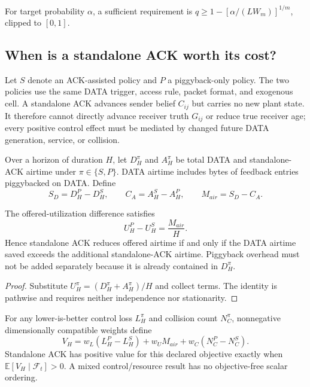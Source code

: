 For target probability $\alpha$, a sufficient requirement is
$q\ge1-[\alpha/(LW_m)]^{1/m}$, clipped to $[0,1]$.

\subsection{When is a standalone ACK worth its cost?}

Let $S$ denote an ACK-assisted policy and $P$ a piggyback-only policy.  The
two policies use the same DATA trigger, access rule, packet format, and
exogenous cell.  A standalone ACK advances sender belief $C_{ij}$ but carries
no new plant state.  It therefore cannot directly advance receiver truth
$G_{ij}$ or reduce true receiver age; every positive control effect must be
mediated by changed future DATA generation, service, or collision.

Over a horizon of duration $H$, let $D_H^\pi$ and $A_H^\pi$ be total DATA and
standalone-ACK airtime under $\pi\in\{S,P\}$.  DATA airtime includes bytes of
feedback entries piggybacked on DATA.  Define
\begin{equation}
S_D=D_H^P-D_H^S,\qquad
C_A=A_H^S-A_H^P,\qquad
M_{air}=S_D-C_A.
\label{eq:s2-ack-accounting-defs}
\end{equation}

\begin{proposition}
The offered-utilization difference satisfies
\begin{equation}
U_H^P-U_H^S=\frac{M_{air}}{H}.
\label{eq:s2-ack-accounting}
\end{equation}
Hence standalone ACK reduces offered airtime if and only if the DATA airtime
saved exceeds the additional standalone-ACK airtime.  Piggyback overhead must
not be added separately because it is already contained in $D_H^\pi$.
\label{prop:s2-ack-accounting}
\end{proposition}

\begin{proof}
Substitute $U_H^\pi=(D_H^\pi+A_H^\pi)/H$ and collect terms.  The identity is
pathwise and requires neither independence nor stationarity.
\end{proof}

For any lower-is-better control loss $L_H^\pi$ and collision count
$N_C^\pi$, nonnegative dimensionally compatible weights define
\begin{equation}
V_H=w_L(L_H^P-L_H^S)+w_UM_{air}+w_C(N_C^P-N_C^S).
\label{eq:s2-ack-weighted-value}
\end{equation}
Standalone ACK has positive value for this declared objective exactly when
$\mathbb E[V_H\mid\mathcal F_t]>0$.  A mixed control/resource result has no
objective-free scalar ordering.

